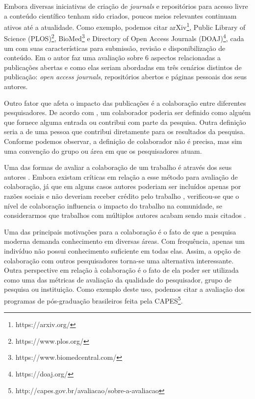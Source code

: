 Embora diversas iniciativas de criação de \textit{journals} e repositórios para acesso livre a conteúdo científico tenham sido criados, poucos meios relevantes continuam ativos até a atualidade. Como exemplo, podemos citar arXiv\footnote{https://arxiv.org/}, Public Library of Science (PLOS)\footnote{https://www.plos.org/}, BioMed\footnote{https://www.biomedcentral.com/} e Directory of Open Access Journals (DOAJ)\footnote{https://doaj.org/}, cada um com suas características para submissão, revisão e disponibilização de conteúdo. Em \cite{OpenAccessAnalysis2004} o autor faz uma avaliação sobre 6 aspectos relacionadas a publicações abertas e como elas seriam abordadas em três cenários distintos de publicação: \textit{open access journals}, repositórios abertos e páginas pessoais dos seus autores.

Outro fator que afeta o impacto das publicações é a colaboração entre diferentes pesquisadores. De acordo com \cite{ResearchCollaboration1997}, um colaborador poderia ser definido como alguém que fornece alguma entrada ou contribui com parte da pesquisa. Outra definição seria a de uma pessoa que contribui diretamente para os resultados da pesquisa. Conforme podemos observar, a definição de colaborador não é precisa, mas sim uma convenção do grupo ou área em que os pesquisadores atuam.

Uma das formas de avaliar a colaboração de um trabalho é através dos seus autores \cite{Bibliographical1971}. Embora existam críticas em relação a esse método para avaliação de colaboração, já que em alguns casos autores poderiam ser incluídos apenas por razões sociais e não deveriam receber crédito pelo trabalho \cite{Stealing1993}, verificou-se que o nível de colaboração influencia o impacto do trabalho na comunidade, se considerarmos que trabalhos com múltiplos autores acabam sendo mais citados \cite{Bibliometrics1986}.

Uma das principais motivações para a colaboração é o fato de que a pesquisa moderna demanda conhecimento em diversas áreas. Com frequência, apenas um indivíduo não possui conhecimento suficiente em todas elas. Assim, a opção de colaboração com outros pesquisadores torna-se uma alternativa interessante. Outra perspective em relação à colaboração é o fato de ela poder ser utilizada como uma das métricas de avaliação da qualidade do pesquisador, grupo de pesquisa ou instituição. Como exemplo deste uso, podemos citar a avaliação dos programas de pós-graduação brasileiros feita pela CAPES\footnote{http://capes.gov.br/avaliacao/sobre-a-avaliacao}.

